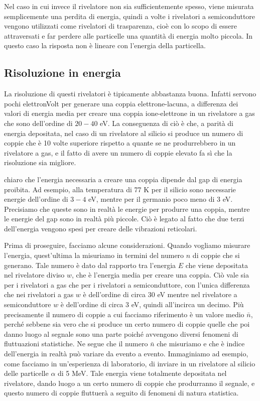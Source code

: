 Nel caso in cui invece il rivelatore non sia sufficientemente spesso, viene misurata semplicemente una perdita di energia, quindi a volte i rivelatori a semiconduttore vengono utilizzati come rivelatori di trasparenza, cioè con lo scopo di essere attraversati e far perdere alle particelle una quantità di energia molto piccola. In questo caso la risposta non è lineare con l'energia della particella.

\subsection{Risoluzione in energia}
La risoluzione di questi rivelatori è tipicamente abbastanza buona. Infatti servono pochi elettronVolt per generare una coppia elettrone-lacuna, a differenza dei valori di energia media per creare una coppia ione-elettrone in un rivelatore a gas che sono dell'ordine di $20-40$ eV. La conseguenza di ciò è che, a parità di energia depositata, nel caso di un rivelatore al silicio si produce un numero di coppie che è 10 volte superiore rispetto a quante se ne produrrebbero in un rivelatore a gas, e il fatto di avere un numero di coppie elevato fa sì che la risoluzione sia migliore.

\E chiaro che l'energia necessaria a creare una coppia dipende dal gap di energia proibita. Ad esempio, alla temperatura di 77 K per il silicio sono necessarie energie dell'ordine di $3-4$ eV, mentre per il germanio poco meno di 3 eV. Precisiamo che queste sono in realtà le energie per produrre una coppia, mentre le energie del gap sono in realtà più piccole. Ciò è legato al fatto che due terzi dell'energia vengono spesi per creare delle vibrazioni reticolari.

Prima di proseguire, facciamo alcune considerazioni. Quando vogliamo misurare l'energia, quest'ultima la misuriamo in termini del numero $n$ di coppie che si generano. Tale numero è dato dal rapporto tra l'energia $E$ che viene depositata nel rivelatore diviso $w$, che è l'energia media per creare una coppia. Ciò vale sia per i rivelatori a gas che per i rivelatori a semiconduttore, con l'unica differenza che nei rivelatori a gas $w$ è dell'ordine di circa 30 eV mentre nel rivelatore a semiconduttore $w$ è dell'ordine di circa 3 eV, quindi all'incirca un decimo. Più precisamente il numero di coppie a cui facciamo riferimento è un valore medio $\bar{n}$, perché sebbene sia vero che si produce un certo numero di coppie quelle che poi danno luogo al segnale sono una parte poiché avvengono diversi fenomeni di fluttuazioni statistiche. Ne segue che il numero $\bar{n}$ che misuriamo e che è indice dell'energia in realtà può variare da evento a evento. Immaginiamo ad esempio, come facciamo in un'esperienza di laboratorio, di inviare in un rivelatore al silicio delle particelle $\alpha$ di 5 MeV. Tale energia viene totalmente depositata nel rivelatore, dando luogo a un certo numero di coppie che produrranno il segnale, e questo numero di coppie fluttuerà a seguito di fenomeni di natura statistica.

